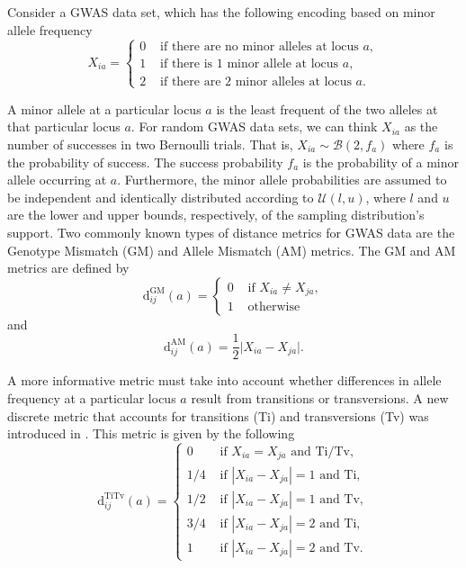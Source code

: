 \documentclass[aoas]{imsart}
\begin{document}
Consider a GWAS data set, which has the following encoding based on minor allele frequency
%
\begin{equation}\label{eq:gwas_data}
X_{ia} = \begin{cases}
0 & \text{ if there are no minor alleles at locus } a,  \\
1 & \text{ if there is 1 minor allele at locus } a, \\
2 & \text{ if there are 2 minor alleles at locus } a.
\end{cases}
\end{equation}

A minor allele at a particular locus $a$ is the least frequent of the two alleles at that particular locus $a$. For random GWAS data sets, we can think $X_{ia}$ as the number of successes in two Bernoulli trials. That is, $X_{ia} \sim \mathcal{B}(2,f_a)$ where $f_a$ is the probability of success. The success probability $f_a$ is the probability of a minor allele occurring at $a$. Furthermore, the minor allele probabilities are assumed to be independent and identically distributed according to $\mathcal{U}(l,u)$, where $l$ and $u$ are the lower and upper bounds, respectively, of the sampling distribution's support. Two commonly known types of distance metrics for GWAS data are the Genotype Mismatch (GM) and Allele Mismatch (AM) metrics. The GM and AM metrics are defined by
%
\begin{equation}\label{eq:diff_GM}
\text{d}^\text{GM}_{ij}(a) = \begin{cases} 
0 & \text{ if } X_{ia} \neq X_{ja}, \\
1 & \text{ otherwise}
\end{cases}
\end{equation}
%
and
%
\begin{equation}\label{eq:diff_AM}
\text{d}^\text{AM}_{ij}(a) = \frac{1}{2}\bigl|X_{ia} - X_{ja}\bigr|.
\end{equation}

A more informative metric must take into account whether differences in allele frequency at a particular locus $a$ result from transitions or transversions. A new discrete metric that accounts for transitions (Ti) and transversions (Tv) was introduced in \cite{arabnejad2018}. This metric is given by the following
%
\begin{equation}\label{eq:diff_TiTv}
\text{d}^\text{TiTv}_{ij}(a) = \begin{cases}
0 & \text{ if } X_{ia} = X_{ja} \text{ and Ti/Tv}, \\
1/4 & \text{ if } |X_{ia} - X_{ja}|=1 \text{ and Ti}, \\
1/2 & \text{ if } |X_{ia} - X_{ja}|=1 \text{ and Tv}, \\
3/4 & \text{ if } |X_{ia} - X_{ja}|=2 \text{ and Ti}, \\
1 & \text{ if } |X_{ia} - X_{ja}|=2 \text{ and Tv}.
\end{cases}
\end{equation}
\end{document}

